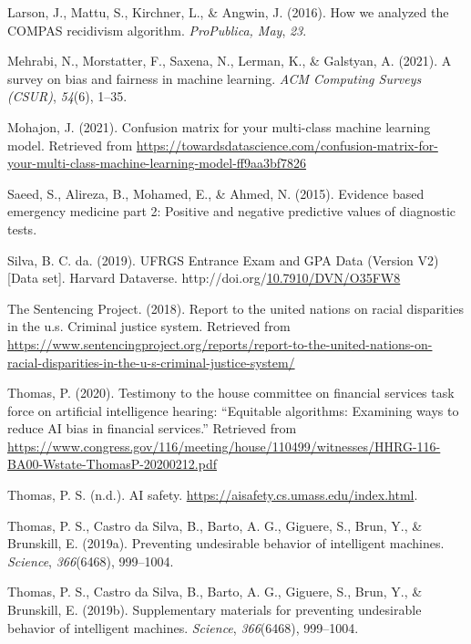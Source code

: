 \documentclass[12pt, twoside]{amherstthesis}
\newenvironment{CSLReferences}[2]%
  {}%
  {\par}
\begin{document}
\begin{CSLReferences}{1}{0}
\leavevmode{}%
Larson, J., Mattu, S., Kirchner, L., \& Angwin, J. (2016). How we analyzed the COMPAS recidivism algorithm. \emph{ProPublica, May}, \emph{23}.

\leavevmode{}%
Mehrabi, N., Morstatter, F., Saxena, N., Lerman, K., \& Galstyan, A. (2021). A survey on bias and fairness in machine learning. \emph{ACM Computing Surveys (CSUR)}, \emph{54}(6), 1--35.

\leavevmode{}%
Mohajon, J. (2021). Confusion matrix for your multi-class machine learning model. Retrieved from \url{https://towardsdatascience.com/confusion-matrix-for-your-multi-class-machine-learning-model-ff9aa3bf7826}

\leavevmode{}%
Saeed, S., Alireza, B., Mohamed, E., \& Ahmed, N. (2015). Evidence based emergency medicine part 2: Positive and negative predictive values of diagnostic tests.

\leavevmode{}%
Silva, B. C. da. (2019). {UFRGS Entrance Exam and GPA Data} (Version V2) {[}Data set{]}. Harvard Dataverse. http://doi.org/\href{https://doi.org/10.7910/DVN/O35FW8}{10.7910/DVN/O35FW8}

\leavevmode{}%
The Sentencing Project. (2018). Report to the united nations on racial disparities in the u.s. Criminal justice system. Retrieved from \url{https://www.sentencingproject.org/reports/report-to-the-united-nations-on-racial-disparities-in-the-u-s-criminal-justice-system/}

\leavevmode{}%
Thomas, P. (2020). Testimony to the house committee on financial services task force on artificial intelligence hearing: {``Equitable algorithms: Examining ways to reduce AI bias in financial services.''} Retrieved from \url{https://www.congress.gov/116/meeting/house/110499/witnesses/HHRG-116-BA00-Wstate-ThomasP-20200212.pdf}

\leavevmode{}%
Thomas, P. S. (n.d.). AI safety. \url{https://aisafety.cs.umass.edu/index.html}.

\leavevmode{}%
Thomas, P. S., Castro da Silva, B., Barto, A. G., Giguere, S., Brun, Y., \& Brunskill, E. (2019a). Preventing undesirable behavior of intelligent machines. \emph{Science}, \emph{366}(6468), 999--1004.

\leavevmode{}%
Thomas, P. S., Castro da Silva, B., Barto, A. G., Giguere, S., Brun, Y., \& Brunskill, E. (2019b). Supplementary materials for preventing undesirable behavior of intelligent machines. \emph{Science}, \emph{366}(6468), 999--1004.

\end{CSLReferences}
\end{document}
